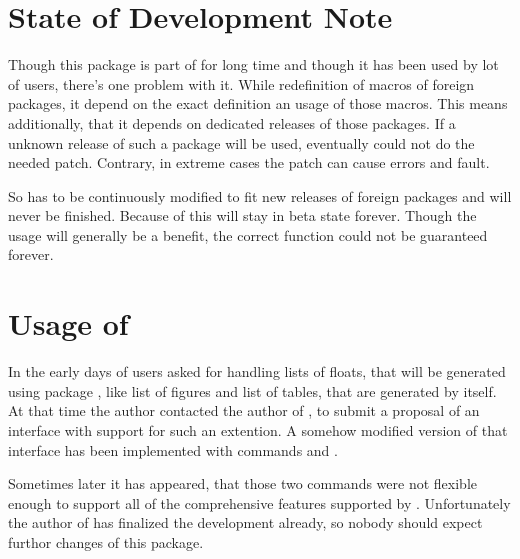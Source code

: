 \section{State of Development Note}
\label{scr:scrhack.draft}

Though this package is part of \KOMAScript{} for long time and though it has
been used by lot of users, there's one problem with it. While redefinition of
macros of foreign packages, it depend on the exact definition an usage of
those macros. This means additionally, that it depends on dedicated releases
of those packages. If a unknown release of such a package will be used,
 eventually could not do the needed patch. Contrary, in
extreme cases the patch can cause errors and fault.

So  has to be continuously modified to fit new releases of
foreign packages and will never be finished. Because of this 
will stay in beta state forever. Though the usage will generally be a
benefit, the correct function could not be guaranteed forever.


\section{Usage of }

In the early days of \KOMAScript{} users asked for handling lists of floats,
that will be generated using package
, like list of
figures and list of tables, that are generated by \KOMAScript{} itself. At
that time the \KOMAScript{} author contacted the author of , to
submit a proposal of an interface with support for such an extention. A
somehow modified version of that interface has been implemented with commands
 and
.

Sometimes later it has appeared, that those two commands were not flexible
enough to support all of the comprehensive features supported by
\KOMAScript. Unfortunately the author of  has finalized the
development already, so nobody should expect furthor changes of this package.

